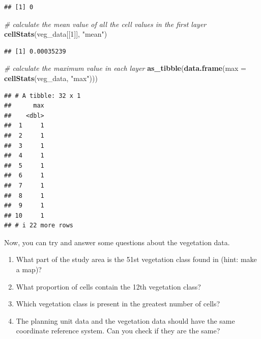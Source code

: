 \documentclass[12pt,]{book}
\makeatletter
\newenvironment{Shaded}{\begin{snugshade}}{\end{snugshade}}
\newcommand{\CommentTok}[1]{\textcolor[rgb]{0.56,0.35,0.01}{\textit{#1}}}
\newcommand{\DataTypeTok}[1]{\textcolor[rgb]{0.13,0.29,0.53}{#1}}
\newcommand{\DecValTok}[1]{\textcolor[rgb]{0.00,0.00,0.81}{#1}}
\newcommand{\KeywordTok}[1]{\textcolor[rgb]{0.13,0.29,0.53}{\textbf{#1}}}
\newcommand{\NormalTok}[1]{#1}
\newcommand{\StringTok}[1]{\textcolor[rgb]{0.31,0.60,0.02}{#1}}
\providecommand{\tightlist}{%
  \setlength{\itemsep}{0pt}\setlength{\parskip}{0pt}}
\newenvironment{kframe}{%
\medskip{}
\setlength{\fboxsep}{.8em}
 \def\at@end@of@kframe{}%
 \ifinner\ifhmode%
  \def\at@end@of@kframe{\end{minipage}}%
  \begin{minipage}{\columnwidth}%
 \fi\fi%
 \def\FrameCommand##1{\hskip\@totalleftmargin \hskip-\fboxsep
 \colorbox{shadecolor}{##1}\hskip-\fboxsep
     \hskip-\linewidth \hskip-\@totalleftmargin \hskip\columnwidth}%
 \MakeFramed {\advance\hsize-\width
   \@totalleftmargin\z@ \linewidth\hsize
   \@setminipage}}%
 {\par\unskip\endMakeFramed%
 \at@end@of@kframe}
\newenvironment{rmdblock}[1]
  {
  \begin{itemize}
  \renewcommand{\labelitemi}{
    \raisebox{-.7\height}[0pt][0pt]{
      {\setkeys{Gin}{width=3em,keepaspectratio}\texttt{[image: images/\#1]}}
    }
  }
  \setlength{\fboxsep}{1em}
  \begin{kframe}
  \item
  }
  {
  \end{kframe}
  \end{itemize}
  }
\newenvironment{rmdquestion}
  {\begin{rmdblock}{question}}
  {\end{rmdblock}}
\makeatother
\begin{document}
\begin{verbatim}
## [1] 0
\end{verbatim}

\begin{Shaded}
\begin{Highlighting}[]
\CommentTok{# calculate the mean value of all the cell values in the first layer}
\KeywordTok{cellStats}\NormalTok{(veg_data[[}\DecValTok{1}\NormalTok{]], }\StringTok{"mean"}\NormalTok{)}
\end{Highlighting}
\end{Shaded}

\begin{verbatim}
## [1] 0.00035239
\end{verbatim}

\clearpage

\begin{Shaded}
\begin{Highlighting}[]
\CommentTok{# calculate the maximum value in each layer}
\KeywordTok{as_tibble}\NormalTok{(}\KeywordTok{data.frame}\NormalTok{(}\DataTypeTok{max =} \KeywordTok{cellStats}\NormalTok{(veg_data, }\StringTok{"max"}\NormalTok{)))}
\end{Highlighting}
\end{Shaded}

\begin{verbatim}
## # A tibble: 32 x 1
##      max
##    <dbl>
##  1     1
##  2     1
##  3     1
##  4     1
##  5     1
##  6     1
##  7     1
##  8     1
##  9     1
## 10     1
## # i 22 more rows
\end{verbatim}

Now, you can try and answer some questions about the vegetation data.

\begin{rmdquestion}
\begin{enumerate}
\def\labelenumi{\arabic{enumi}.}
\tightlist
\item
  What part of the study area is the 51st vegetation class found in (hint: make a map)?
\item
  What proportion of cells contain the 12th vegetation class?
\item
  Which vegetation class is present in the greatest number of cells?
\item
  The planning unit data and the vegetation data should have the same coordinate reference system. Can you check if they are the same?
\end{enumerate}
\end{rmdquestion}
\end{document}
